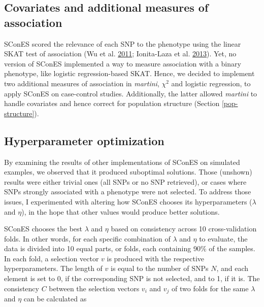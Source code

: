 \documentclass[
  11pt,
]{env/yjiao}
\begin{document}
\hypertarget{covariates-and-additional-measures-of-association}{%
\subsection{Covariates and additional measures of association}\label{covariates-and-additional-measures-of-association}}

SConES scored the relevance of each SNP to the phenotype using the linear SKAT test of association (Wu et al. \protect\hyperlink{ref-wu_rare-variant_2011}{2011}; Ionita-Laza et al. \protect\hyperlink{ref-ionita-laza_sequence_2013}{2013}). Yet, no version of SConES implemented a way to measure association with a binary phenotype, like logistic regression-based SKAT. Hence, we decided to implement two additional measures of association in \emph{martini}, \(\chi^2\) and logistic regression, to apply SConES on case-control studies. Additionally, the latter allowed \emph{martini} to handle covariates and hence correct for population structure (Section \ref{pop-structure}).

\hypertarget{hyperparameter-optimization}{%
\subsection{Hyperparameter optimization}\label{hyperparameter-optimization}}

By examining the results of other implementations of SConES on simulated examples, we observed that it produced suboptimal solutions. Those (unshown) results were either trivial ones (all SNPs or no SNP retrieved), or cases where SNPs strongly associated with a phenotype were not selected. To address those issues, I experimented with altering how SConES chooses its hyperparameters (\(\lambda\) and \(\eta\)), in the hope that other values would produce better solutions.

SConES chooses the best \(\lambda\) and \(\eta\) based on consistency across 10 cross-validation folds. In other words, for each specific combination of \(\lambda\) and \(\eta\) to evaluate, the data is divided into 10 equal parts, or folds, each containing 90\% of the samples. In each fold, a selection vector \(v\) is produced with the respective hyperparameters. The length of \(v\) is equal to the number of SNPs \(N\), and each element is set to 0, if the corresponding SNP is not selected, and to 1, if it is. The consistency \(C\) between the selection vectors \(v_i\) and \(v_j\) of two folds for the same \(\lambda\) and \(\eta\) can be calculated as
\end{document}
